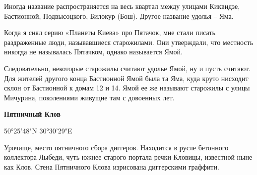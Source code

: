 Иногда название распространяется на весь квартал между улицами Киквидзе, Бастионной, Подвысоцкого, Билокур (Бош). Другое название удолья – Яма.

Когда я снял серию «Планеты Киева» про Пятачок, мне стали писать раздраженные люди, называвшиеся старожилами. Они утверждали, что местность никогда не называлась Пятачком, однако называется Ямой. 

Следовательно, некоторые старожилы считают удолье Ямой, ну и пусть считают. Для жителей другого конца Бастионной Ямой была та Яма, куда круто нисходит склон от Бастионной к домам 12 и 14. Ямой ее же называют старожилы с улицы Мичурина, поколениями живущие там с довоенных лет.\\

\medskip

\textbf{Пятничный Клов}

50°25'48"N 30°30'29"E

Урочище, место пятничного сбора диггеров. Находится в русле бетонного коллектора Лыбеди, чуть южнее старого портала речки Кловицы, известной ныне как Клов. Стена Пятничного Клова изрисована диггерскими граффити.
